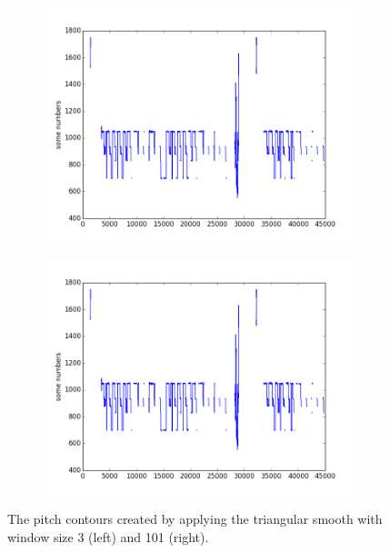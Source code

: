 \begin{figure}[b]
        \centering
 		\begin{subfigure}[b]{0.47\textwidth}
                \includegraphics[width=\textwidth]{Figures/triangular}
        \end{subfigure}
        \begin{subfigure}[b]{0.47\textwidth}
                \includegraphics[width=\textwidth]{Figures/triangular_101}
        \end{subfigure}
    \caption{The pitch contours created by applying the triangular smooth with window size 3 (left) and 101 (right).}
	\label{fig:triangular}
\end{figure}



